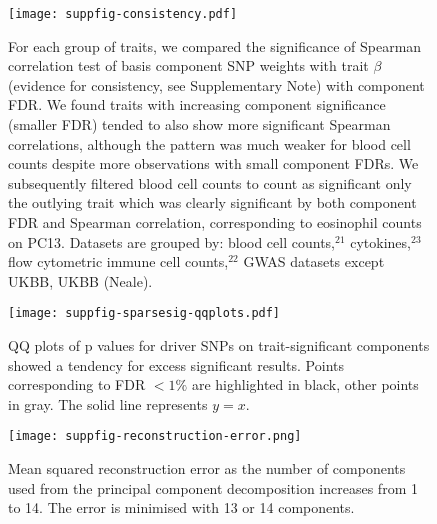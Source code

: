 \documentclass[11pt]{article}
\begin{document}
 
 \begin{figure}
  \centering
  \texttt{[image: suppfig-consistency.pdf]}
  \caption{For each group of traits, we compared the significance of Spearman correlation test of basis component SNP weights with trait $\beta$ (evidence for consistency, see Supplementary Note) with component FDR. We found traits with increasing component significance (smaller FDR) tended to also show more significant Spearman correlations, although the pattern was much weaker for blood cell counts despite more observations with small component FDRs.  We subsequently filtered blood cell counts to count as significant only the outlying trait which was clearly significant by both component FDR and Spearman correlation, corresponding to eosinophil counts on PC13. Datasets are grouped by: blood cell counts,$^{21}$ cytokines,$^{23}$ flow cytometric immune cell counts,$^{22}$ GWAS datasets except UKBB, UKBB (Neale).}
  \label{sfig:2}
\end{figure}



\begin{figure}
  \centering
  \texttt{[image: suppfig-sparsesig-qqplots.pdf]}
  \caption{QQ plots of p values for driver SNPs on trait-significant components showed a tendency for excess significant results. Points corresponding to FDR $< 1\%$ are highlighted in black, other points in gray. The solid line represents $y=x$.}
  \label{sfig:4}
\end{figure}


\begin{figure}
  \centering
  \texttt{[image: suppfig-reconstruction-error.png]}
  \caption{Mean squared reconstruction error as the number of components used from the principal component decomposition increases from 1 to 14. The error is minimised with 13 or 14 components.}
  \label{fig:recon-error}
\end{figure}
\end{document}
